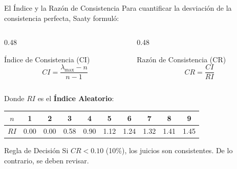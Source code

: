 \documentclass[aspectratio=169, 10pt]{beamer}
\begin{document}
\begin{frame}{El Índice y la Razón de Consistencia}
    \small
    Para cuantificar la desviación de la consistencia perfecta, Saaty formuló:
    \begin{columns}[T]
        \begin{column}{0.48\textwidth}
            \begin{block}{Índice de Consistencia (CI)}
                \[ CI = \frac{\lambda_{\max} - n}{n-1} \]
            \end{block}
        \end{column}
        \begin{column}{0.48\textwidth}
            \begin{block}{Razón de Consistencia (CR)}
                \[ CR = \frac{CI}{RI} \]
            \end{block}
        \end{column}
    \end{columns}
    \smallskip
    Donde $RI$ es el \textbf{Índice Aleatorio}:
    \begin{center}
        \scriptsize
        \begin{tabular}{cccccccccc}
            \toprule
            $n$ & 1 & 2 & 3 & 4 & 5 & 6 & 7 & 8 & 9 \\
            \midrule
            $RI$ & 0.00 & 0.00 & 0.58 & 0.90 & 1.12 & 1.24 & 1.32 & 1.41 & 1.45 \\
            \bottomrule
        \end{tabular}
    \end{center}
    \begin{alertblock}{Regla de Decisión}
        \scriptsize
        Si $CR < 0.10$ (10\%), los juicios son consistentes. De lo contrario, se deben revisar.
    \end{alertblock}
\end{frame}
\end{document}

